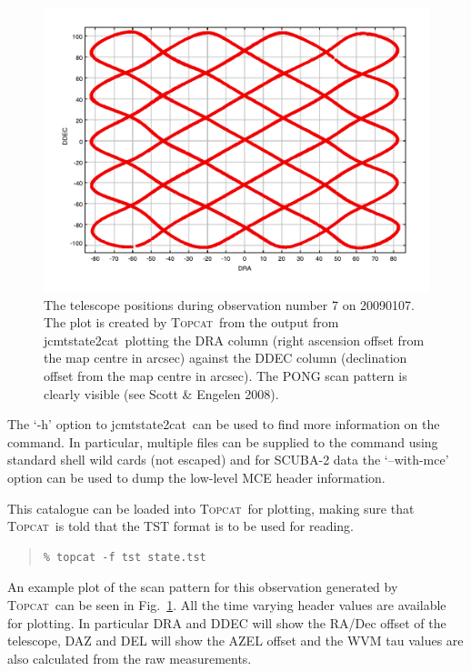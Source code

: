 \documentclass[twoside,11pt]{article}
\newcommand{\xref}[3]{#1}
\renewcommand{\_}{\texttt{\symbol{95}}}
\newenvironment{myquote}{\begin{quote}\begin{small}}{\end{small}\end{quote}}
\newcommand{\topcat}{\xref{\textsc{Topcat}}{sun253}{}}
\newcommand{\task}[1]{\textsf{#1}}
\newcommand{\jcmtstate}{\xref{\task{jcmtstate2cat}}{sun258}{JCMTSTATE2CAT}}
\begin{document}
\begin{figure}
\begin{center}
\includegraphics{sc19_scan_pattern}
\caption{The telescope positions during observation number 7 on
  20090107. The plot is created by \topcat\ from the output from
  \jcmtstate\ plotting the DRA column (right ascension offset from the
  map centre in arcsec) against the DDEC column (declination offset
  from the map centre in arcsec). The PONG scan pattern is clearly
  visible (see Scott \& Engelen 2008\cite{sc2ana005}).}
\label{fig:topcat}
\end{center}
\end{figure}

The `-h' option to \jcmtstate\ can be used to find more information on
the command. In particular, multiple files can be supplied to the
command using standard shell wild cards (not escaped) and for SCUBA-2
data the `--with-mce' option can be used to dump the low-level MCE
header information.

This catalogue can be loaded into \topcat\ for plotting, making sure
that \topcat\ is told that the TST format is to be used for reading.

\begin{myquote}
\begin{verbatim}
% topcat -f tst state.tst
\end{verbatim}
\end{myquote}

An example plot of the scan pattern for this observation generated by
\topcat\ can be seen in Fig.~\ref{fig:topcat}. All the time varying
header values are available for plotting. In particular DRA and DDEC
will show the RA/Dec offset of the telescope, DAZ and DEL will show
the AZEL offset and the WVM tau values are also calculated from the
raw measurements.
\end{document}
